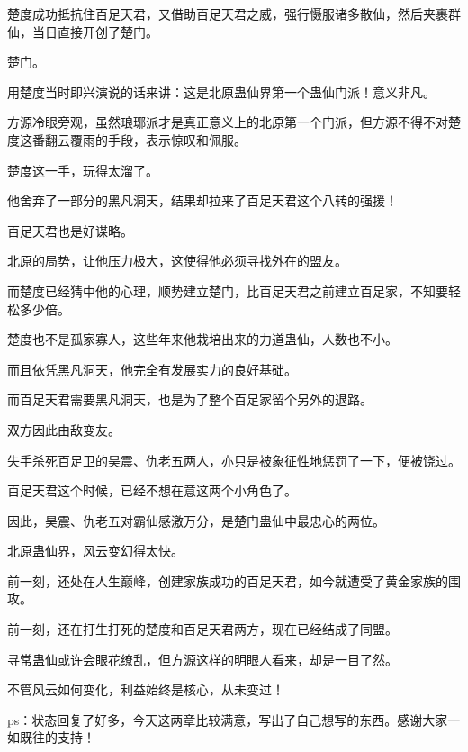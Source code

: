 \begin{this_body}
楚度成功抵抗住百足天君，又借助百足天君之威，强行慑服诸多散仙，然后夹裹群仙，当日直接开创了楚门。

楚门。

用楚度当时即兴演说的话来讲：这是北原蛊仙界第一个蛊仙门派！意义非凡。

方源冷眼旁观，虽然琅琊派才是真正意义上的北原第一个门派，但方源不得不对楚度这番翻云覆雨的手段，表示惊叹和佩服。

楚度这一手，玩得太溜了。

他舍弃了一部分的黑凡洞天，结果却拉来了百足天君这个八转的强援！

百足天君也是好谋略。

北原的局势，让他压力极大，这使得他必须寻找外在的盟友。

而楚度已经猜中他的心理，顺势建立楚门，比百足天君之前建立百足家，不知要轻松多少倍。

楚度也不是孤家寡人，这些年来他栽培出来的力道蛊仙，人数也不小。

而且依凭黑凡洞天，他完全有发展实力的良好基础。

而百足天君需要黑凡洞天，也是为了整个百足家留个另外的退路。

双方因此由敌变友。

失手杀死百足卫的昊震、仇老五两人，亦只是被象征性地惩罚了一下，便被饶过。

百足天君这个时候，已经不想在意这两个小角色了。

因此，昊震、仇老五对霸仙感激万分，是楚门蛊仙中最忠心的两位。

北原蛊仙界，风云变幻得太快。

前一刻，还处在人生巅峰，创建家族成功的百足天君，如今就遭受了黄金家族的围攻。

前一刻，还在打生打死的楚度和百足天君两方，现在已经结成了同盟。

寻常蛊仙或许会眼花缭乱，但方源这样的明眼人看来，却是一目了然。

不管风云如何变化，利益始终是核心，从未变过！

ps：状态回复了好多，今天这两章比较满意，写出了自己想写的东西。感谢大家一如既往的支持！

\end{this_body}

